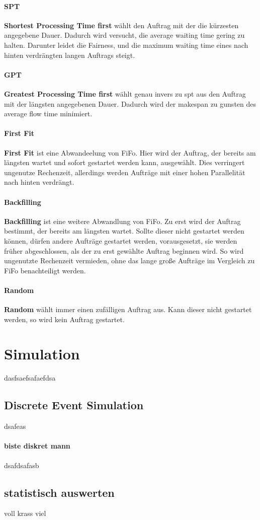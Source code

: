 \paragraph{SPT}
\textbf{Shortest Processing Time first} wählt den Auftrag mit der die kürzesten angegebene Dauer. Dadurch wird versucht, die average waiting time gering zu halten. Darunter leidet die Fairness, und die maximum waiting time eines nach hinten verdrängten langen Auftrags steigt.

\paragraph{GPT}
\textbf{Greatest Processing Time first} wählt genau invers zu spt aus den Auftrag mit der längsten angegebenen Dauer. Dadurch wird der makespan zu gunsten des average flow time minimiert.

\paragraph{First Fit}
\textbf{First Fit} ist eine Abwandeelung von FiFo. Hier wird  der Auftrag, der bereits am längsten wartet und sofort gestartet werden kann, ausgewählt. Dies verringert ungenutze Rechenzeit, allerdings werden Aufträge mit einer hohen Parallelität nach hinten verdrängt.

\paragraph{Backfilling}
\textbf{Backfilling} ist eine weitere Abwandlung von FiFo. Zu erst wird der Auftrag bestimmt, der bereits am längsten wartet. Sollte dieser nicht gestartet werden können, dürfen andere Aufträge gestartet werden, vorausgesetzt, sie werden früher abgeschlossen, als der zu erst gewählte Auftrag beginnen wird. So wird ungenutzte Rechenzeit vermieden, ohne das lange große Aufträge im Vergleich zu FiFo benachteiligt werden.

\paragraph{Random}
\textbf{Random} wählt immer einen zufälligen Auftrag aus. Kann dieser nicht gestartet werden, so wird kein Auftrag gestartet.

\section{Simulation}

dasfsaefsafaefdsa

\subsection{Discrete Event Simulation}

dsafeas

\paragraph{biste diskret mann}
dsafdsafasb

\subsection{statistisch auswerten}

voll krass viel
